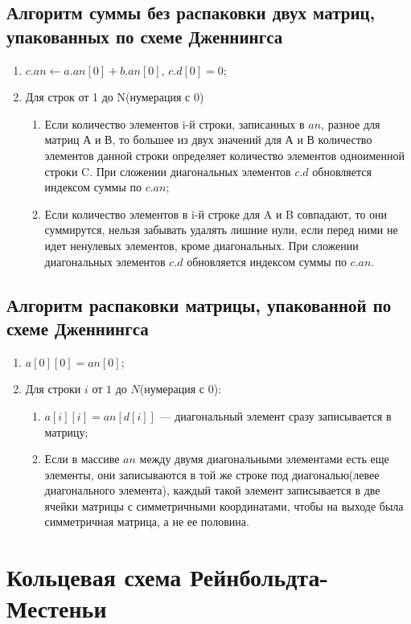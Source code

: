 \documentclass[12pt, a4paper]{article}
\begin{document}
\subsection{Алгоритм суммы без распаковки двух 
матриц, упакованных по схеме Дженнингса}
\begin{enumerate}
	\item $c.an \leftarrow a.an[0]+b.an[0]$, 
	$c.d[0]=0$;
	\item Для строк от 1 до N(нумерация с 0)
	\begin{enumerate}
		\item Если количество элементов i-й строки,
		записанных в $an$, разное для матриц А и В,
		то большее из двух значений для А и В 
		количество элементов данной строки 
		определяет количество элементов одноименной
		строки C. При сложении 
		диагональных элементов $c.d$ обновляется 
		индексом суммы по $c.an$;
		\item Если количество элементов в i-й строке
		для A и B совпадают, то они
		суммирутся, нельзя забывать удалять лишние 
		нули, если перед ними не идет ненулевых 
		элементов, кроме диагональных. При сложении 
		диагональных элементов $c.d$ обновляется 
		индексом суммы по $c.an$.
	\end{enumerate}
\end{enumerate}
\subsection{Алгоритм распаковки матрицы, упакованной 
по схеме Дженнингса}
\begin{enumerate}
	\item $a[0][0] = an[0]$;
	\item Для строки $i$ от $1$ до $N$(нумерация с 
	0):
	\begin{enumerate}
		\item $a[i][i] = an[d[i]]$ --- диагональный элемент сразу записывается
		в матрицу;
		\item Если в массиве $an$ между двумя 
		диагональными элементами есть еще элементы, 
		они записываются в той же строке под 
		диагональю(левее диагонального элемента), 
		каждый такой элемент записывается в две 
		ячейки матрицы с симметричными координатами, 
		чтобы на выходе была симметричная матрица, а 
		не ее половина.
	\end{enumerate}
\end{enumerate}
\section{Кольцевая схема Рейнбольдта-Местеньи}
\end{document}
